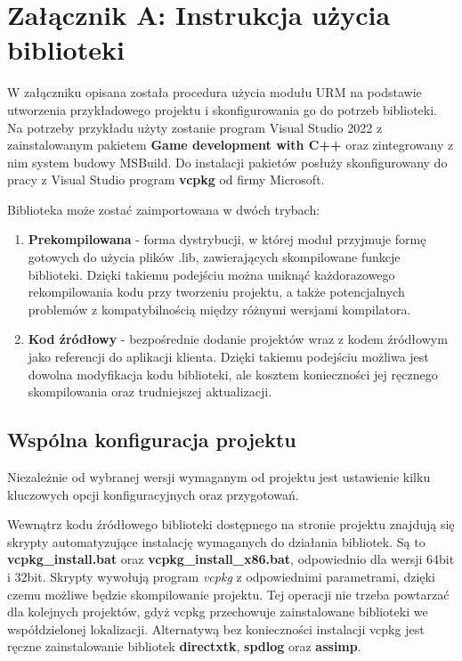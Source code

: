 \chapter*{Załącznik A: Instrukcja użycia biblioteki}
W załączniku opisana została procedura użycia modułu URM na podstawie utworzenia przykładowego projektu i skonfigurowania go do potrzeb biblioteki. Na potrzeby przykładu użyty zostanie program Visual Studio 2022 z zainstalowanym pakietem \textbf{Game development with C++} oraz zintegrowany z nim system budowy MSBuild. Do instalacji pakietów posłuży skonfigurowany do pracy z Visual Studio program \textbf{vcpkg} od firmy Microsoft. 

Biblioteka może zostać zaimportowana w dwóch trybach:
\begin{enumerate}
	\item \textbf{Prekompilowana} - forma dystrybucji, w której moduł przyjmuje formę gotowych do użycia plików .lib, zawierających skompilowane funkcje biblioteki. Dzięki takiemu podejściu można uniknąć każdorazowego rekompilowania kodu przy tworzeniu projektu, a także potencjalnych problemów z kompatybilnością między różnymi wersjami kompilatora. 
	\item \textbf{Kod źródłowy} - bezpośrednie dodanie projektów wraz z kodem źródłowym jako referencji do aplikacji klienta. Dzięki takiemu podejściu możliwa jest dowolna modyfikacja kodu biblioteki, ale kosztem konieczności jej ręcznego skompilowania oraz trudniejszej aktualizacji.
\end{enumerate}

\section*{Wspólna konfiguracja projektu}
Niezależnie od wybranej wersji wymaganym od projektu jest ustawienie kilku kluczowych opcji konfiguracyjnych oraz przygotowań.

Wewnątrz kodu źródłowego biblioteki dostępnego na stronie projektu \cite{GitHub:Minik:MasterThesisUniversalRenderingModuleD3D11} znajdują się skrypty automatyzujące instalację wymaganych do działania bibliotek. Są to \textbf{vcpkg\_install.bat} oraz \textbf{vcpkg\_install\_x86.bat}, odpowiednio dla wersji 64bit i 32bit. Skrypty wywołują program \textit{vcpkg} z odpowiednimi parametrami, dzięki czemu możliwe będzie skompilowanie projektu. Tej operacji nie trzeba powtarzać dla kolejnych projektów, gdyż vcpkg przechowuje zainstalowane biblioteki we współdzielonej lokalizacji. Alternatywą bez konieczności instalacji vcpkg jest ręczne zainstalowanie bibliotek \textbf{directxtk}, \textbf{spdlog} oraz \textbf{assimp}.

